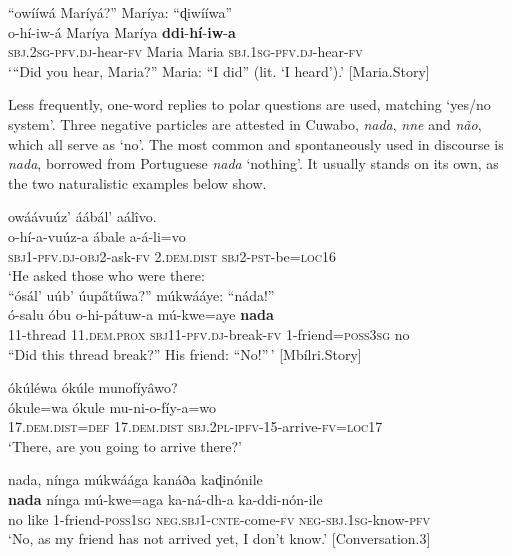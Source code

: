 \documentclass[output=paper,colorlinks=true, citecolor=brown,draftmode]{langscibook}
\begin{document}
{\ea\label{ex:cuw:53} “owííwá Maríyá?” Maríya: “ɖiwííwa” \\
    \gll o-hí-iw-á Maríya Maríya \textbf{ddi}{}-\textbf{hí}{}-\textbf{iw}{}-\textbf{a}  \\
          \textsc{sbj.2sg-pfv.dj}{}-hear-\textsc{fv} Maria Maria \textsc{sbj.1sg-pfv.dj}{}-hear-\textsc{fv} \\
    \glt ‘“Did you hear, Maria?” Maria: “I did” (lit. ‘I heard’).’ [Maria.Story]
\z }

Less frequently, one-word replies to polar questions are used, matching  ‘yes/no system’. Three negative particles are attested in Cuwabo, \textit{nada}, \textit{nne} and \textit{não}, which all serve as ‘no’. The most common and spontaneously used in discourse is \textit{nada}, borrowed from Portuguese \textit{nada} ‘nothing’. It usually stands on its own, as the two naturalistic examples below show. 

\ea\label{ex:cuw:54} owáávuúz’ áábál’ aálîvo. \\ 
    \gll  o-hí{}-a-vuúz-a ábale a-á{}-li=vo  \\
          \textsc{sbj1-pfv.dj-obj2}{}-ask-\textsc{fv} 2.\textsc{dem.dist} \textsc{sbj2-pst}{}-be=\textsc{loc16}  \\
    \glt ‘He asked those who were there: \\
\medskip  “ósál’ uúb’ úup\H{a}t\H{u}wa?” múkwááye: “náda!”\\
    \gll ó-salu óbu o-hi-pátuw-a mú-kwe=aye \textbf{nada} \\
           11-thread 11.\textsc{dem.prox} \textsc{sbj11-pfv.dj}{}-break-\textsc{fv} 1-friend=\textsc{poss3sg} no \\
    \glt “Did this thread break?” His friend: “No!”\,’ [Mbílri.Story]
\z 

\ea\label{ex:cuw:55}
    \begin{xlist}[A: ]
    \label{ex:cuw:55A} ókúléwa ókúle munofíyâwo? \\ 
        \gll  ókule=wa ókule mu-ni-o-fíy-a=wo \\ 
             17.\textsc{dem.dist=def} \textsc{17.dem.dist} \textsc{sbj.2pl-ipfv-15}{}-arrive-\textsc{fv=loc17}\\
        \glt  ‘There, are you going to arrive there?’ 

    \label{ex:cuw:55B} nada, nínga múkwáága kanáða kaɖinónile\\ 
        \gll   \textbf{nada} nínga mú-kwe=aga ka-ná-dh-a ka-ddi-nón-ile \\
               no like 1-friend-\textsc{poss1sg} \textsc{neg.sbj1-cnte-}come-\textsc{fv} \textsc{neg-sbj.1sg}{}-know-\textsc{pfv} \\
        \glt ‘No, as my friend has not arrived yet, I don’t know.’ [Conversation.3]
    \end{xlist}
\z 
\end{document}
